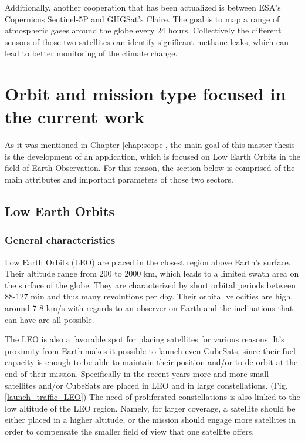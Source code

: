 Additionally, another cooperation that has been actualized is between ESA's Copernicus Sentinel-5P and GHGSat’s Claire. The goal is to map a range of atmospheric gases around the globe every 24 hours. Collectively the different sensors of those two satellites can identify significant methane leaks, which can lead to better monitoring of the climate change. \cite{cooperation} %


\bigskip
\section{Orbit and mission type focused in the current work}
\bigskip

As it was mentioned in Chapter \ref{chap:scope}, the main goal of this master thesis is the development of an application, which is focused on Low Earth Orbits in the field of Earth Observation. For this reason, the section below is comprised of the main attributes and important parameters of those two sectors.

\bigskip
\subsection{Low Earth Orbits}
\bigskip

\subsubsection{General characteristics}
\bigskip
Low Earth Orbits (LEO) are placed in the closest region above Earth's surface. Their altitude range from 200 to 2000 km, which leads to a limited swath area on the surface of the globe. They are characterized by short orbital periods between 88-127 min and thus many revolutions per day. Their orbital velocities are high, around 7-8 km/s with regards to an observer on Earth and the inclinations that can have are all possible. \cite{Campbell}

The LEO is also a favorable spot for placing satellites for various reasons. It's proximity from Earth makes it possible to launch even CubeSats, since their fuel capacity is enough to be able to maintain their position and/or to de-orbit at the end of their mission. Specifically in the recent years more and more small satellites and/or CubeSats are placed in LEO and in large constellations. (Fig. \ref{launch_traffic_LEO}) The need of proliferated constellations is also linked to the low altitude of the LEO region. Namely, for larger coverage, a satellite should be either placed in a higher altitude, or the mission should engage more satellites in order to compensate the smaller field of view that one satellite offers.

